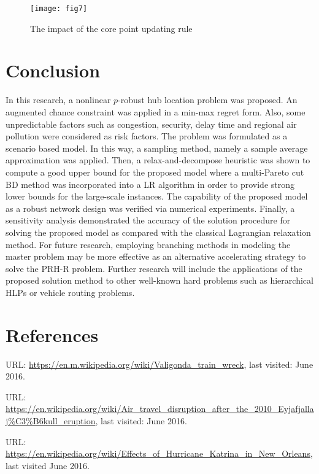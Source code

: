 \documentclass[review]{elsarticle}
\begin{document}
\begin{figure}[h!]
\centering
\texttt{[image: fig7]}
\caption{The impact of the core point updating rule}\label{fig7}
\end{figure}

\section{Conclusion}

In this research, a nonlinear $p$-robust hub location problem was proposed. An augmented chance constraint was applied in a min-max regret form. Also, some unpredictable factors such as congestion, security, delay time and regional air pollution were considered as risk factors. The problem was formulated as a scenario based model. In this way, a sampling method, namely a sample average approximation was applied. Then, a relax-and-decompose heuristic was shown to compute a good upper bound for the proposed model where a multi-Pareto cut BD method was incorporated into a LR algorithm in order to provide strong lower bounds for the large-scale instances. The capability of the proposed model as a robust network design was verified via numerical experiments. Finally, a sensitivity analysis demonstrated the accuracy of the solution procedure for solving the proposed model as compared with the classical Lagrangian relaxation method. For future research, employing branching methods in modeling the master problem may be more effective as an alternative accelerating strategy to solve the PRH-R problem. Further research will include the applications of the proposed solution method to other well-known hard problems such as hierarchical HLPs or vehicle routing problems.


\section*{References}




\noindent URL: \url{https://en.m.wikipedia.org/wiki/Valigonda_train_wreck}, last visited: June 2016. 

\noindent URL: \url{https://en.wikipedia.org/wiki/Air\_travel_disruption_after_the_2010_Eyjafjallaj%C3%B6kull_eruption}, last visited: June 2016. 

\noindent URL:\url{ https://en.wikipedia.org/wiki/Effects_of_Hurricane_Katrina_in_New_Orleans}, last visited June 2016. 

\citep{1,2,3,4,5,6,7,8,9,10,11,12,13,14,15,16,17,18,19,20,21,22,23,24,25,26,27,28,29,30,31,32,33,34,35,36,37,38,39,40,41,42,43,44,45,46,47,48,49,50,51,52,53,54,55,56,57,58,59,60,61,62,63,64,65,66,67,68,69}
\end{document}
